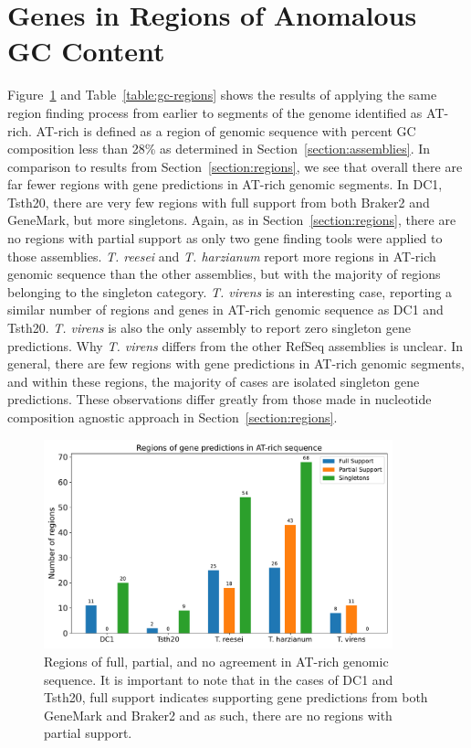 \section{Genes in Regions of Anomalous GC Content}\label{section:gc-regions}

Figure~\ref{fig:gc-regions} and Table~\ref{table:gc-regions} shows the results of applying the same
region finding process from earlier to segments of the genome
identified as AT-rich. AT-rich is defined as a region of genomic
sequence with percent GC composition less than 28\% as determined in
Section~\ref{section:assemblies}. In comparison to results from
Section~\ref{section:regions}, we see that overall there are far fewer
regions with gene predictions in AT-rich genomic segments. In DC1,
Tsth20, there are very few regions with full support from both Braker2
and GeneMark, but more singletons. Again, as in Section~\ref{section:regions}, there are no regions with partial support as
only two gene finding tools were applied to those
assemblies. \textit{T. reesei} and \textit{T. harzianum} report more
regions in AT-rich genomic sequence than the other assemblies, but
with the majority of regions belonging to the singleton
category. \textit{T. virens} is an interesting case, reporting a similar number of regions and genes in AT-rich genomic sequence as
DC1 and Tsth20. \textit{T. virens} is also the only assembly to report
zero singleton gene predictions. Why \textit{T. virens} differs from
the other RefSeq assemblies is unclear. In general, there are few
regions with gene predictions in AT-rich genomic segments, and within
these regions, the majority of cases are isolated singleton gene
predictions. These observations differ greatly from those made in
nucleotide composition agnostic approach in Section~\ref{section:regions}.

\begin{figure}
  \centering
  \includegraphics[width=0.90\textwidth]{figures/atrich-regions-barplot.pdf}
  \caption[Regions of agreement in AT-rich genomic sequence]{Regions of full, partial, and no agreement in AT-rich genomic sequence. It is important to note that in the cases of DC1 and Tsth20, full support indicates supporting gene predictions from both GeneMark and Braker2 and as such, there are no regions with partial support.}\label{fig:gc-regions}
\end{figure}

